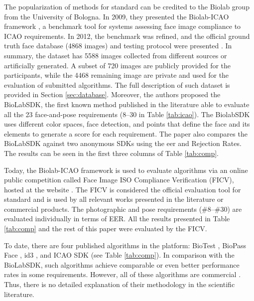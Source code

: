The popularization of methods for \icao standard can be credited to the Biolab group from the University of Bologna. In 2009, they presented the Biolab-ICAO framework \citep{maltoni2009biolab}, a benchmark tool for systems assessing face image compliance to ICAO requirements. In 2012, the benchmark was refined, and the official ground truth face database (4868 images) and testing protocol were presented \citep{ferrara2012face}. In summary, the dataset has 5588 images collected from different sources or artificially generated. A subset of 720 images are publicly provided for the participants, while the 4468 remaining image are private and used for the evaluation of submitted algorithms. The full description of such dataset is provided in Section \ref{sec:database}. Moreover, the authors proposed the BioLabSDK, the first known method published in the literature able to evaluate all the 23 face-and-pose requirements (8--30 in Table \ref{tab:icao}). The BiolabSDK uses different color spaces, face detection, and points that define the face and its elements to generate a score for each requirement. The paper also compares the BioLabSDK against two anonymous SDKs using the \acs{eer} and Rejection Rates. The results can be seen in the first three columns of Table \ref{tab:comp}.



Today, the Biolab-ICAO framework is used to evaluate algorithms via an online public competition called Face Image ISO Compliance Verification (FICV), hosted at the \fvcongoing website \citep{fvcongoing}. The FICV is considered the official evaluation tool for \icao standard and is used by all relevant works presented in the literature or commercial products. The photographic and pose requirements (\#8--\#30) are evaluated individually in terms of EER. All the results presented in Table \ref{tab:comp} and the rest of this paper were evaluated by the FICV.

To date, there are four published algorithms in the \fvcongoing platform: BioTest \citep{fvcBioTest}, BioPass Face \citep{fvcVsoft}, id3 \citep{fvcICAOCompliance}, and ICAO SDK \citep{fvcSeamfix} (see Table \ref{tab:comp}). In comparison with the BioLabSDK, such algorithms achieve comparable or even better performance rates in some requirements. However, all of these algorithms are commercial \citep{biometrika, id3, seamfix, vsoft}. Thus, there is no detailed explanation of their methodology in the scientific literature.

